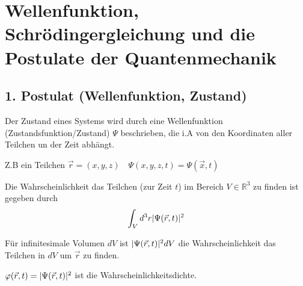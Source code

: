 \section{Wellenfunktion, Schrödingergleichung und die Postulate der
Quantenmechanik} %
\label{sec:Wellenfunktion,_Schrödingergleichung_und_die_Postulate_der_Quantenmech}
\subsection{1. Postulat (Wellenfunktion, Zustand)} %
\label{ssub:1._Postulat_(Wellenfunktion,_Zustand)}
Der Zustand eines \qmn Systems wird durch eine Wellenfunktion
(Zustandsfunktion/Zustand) $\Psi$ beschrieben, die i.A von den Koordinaten
aller Teilchen un der Zeit abhängt.

Z.B ein Teilchen $\vec{r}=(x,y,z) \quad \Psi(x,y,z,t)= \Psi(\vec{x},t)$

Die Wahrscheinlichkeit das Teilchen (zur Zeit $t$) im Bereich $V \in
\mathbb{R}^3$ zu finden ist gegeben durch
\begin{equation*}
    \int_V d^3 r \lvert \Psi(\vec{r},t)\rvert^2
\end{equation*}

Für infinitesimale Volumen $dV$ ist $\lvert \Psi(\vec{r},t)\rvert^2 dV$ die
Wahrscheinlichkeit das Teilchen in $dV$ um $\vec{r}$ zu finden.
    
$\varphi(\vec{r},t) = \lvert \Psi(\vec{r},t)\rvert^2$ ist die Wahrscheinlichkeitsdichte.

